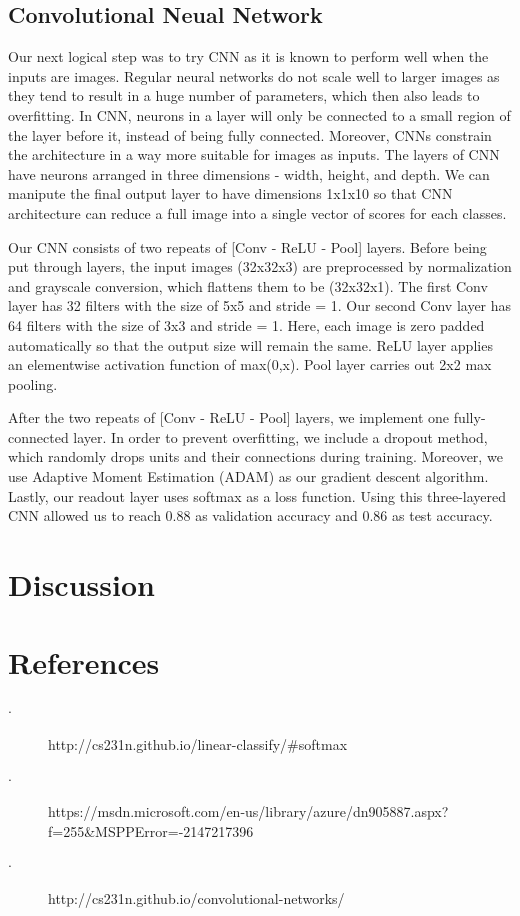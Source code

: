 \documentclass[12pt]{article}
\begin{document}
\subsection{Convolutional Neual Network}
\indent \indent Our next logical step was to try CNN as it is known to perform well when the inputs are images. Regular neural networks do not scale well to larger images as they tend to result in a huge number of parameters, which then also leads to overfitting. In CNN, neurons in a layer will only be connected to a small region of the layer before it, instead of being fully connected.  Moreover, CNNs constrain the architecture in a way more suitable for images as inputs. The layers of CNN have neurons arranged in three dimensions - width, height, and depth. We can manipute the final output layer to have dimensions 1x1x10 so that CNN architecture can reduce a full image into a single vector of scores for each classes. 

\indent Our CNN consists of two repeats of [Conv - ReLU - Pool] layers. Before being put through layers, the input images (32x32x3) are preprocessed by normalization and grayscale conversion, which flattens them to be (32x32x1). The first Conv layer has 32 filters with the size of 5x5 and stride = 1. Our second Conv layer has 64 filters with the size of 3x3 and stride = 1. Here, each image is zero padded automatically so that the output size will remain the same. ReLU layer applies an elementwise activation function of max(0,x). Pool layer carries out 2x2 max pooling. 

\indent After the two repeats of [Conv - ReLU - Pool] layers, we implement one fully-connected layer. In order to prevent overfitting, we include a dropout method, which randomly drops units and their connections during training. Moreover, we use Adaptive Moment Estimation (ADAM) as our gradient descent algorithm. Lastly, our readout layer uses softmax as a loss function. Using this three-layered CNN allowed us to reach 0.88 as validation accuracy and 0.86 as test accuracy. 

\section{Discussion}


\section {References}
\begin{description}
	\item[$\cdot$] http://cs231n.github.io/linear-classify/\#softmax
	\item[$\cdot$] https://msdn.microsoft.com/en-us/library/azure/dn905887.aspx?f=255\&MSPPError=-2147217396
	\item[$\cdot$] http://cs231n.github.io/convolutional-networks/
\end{description}
\end{document}
